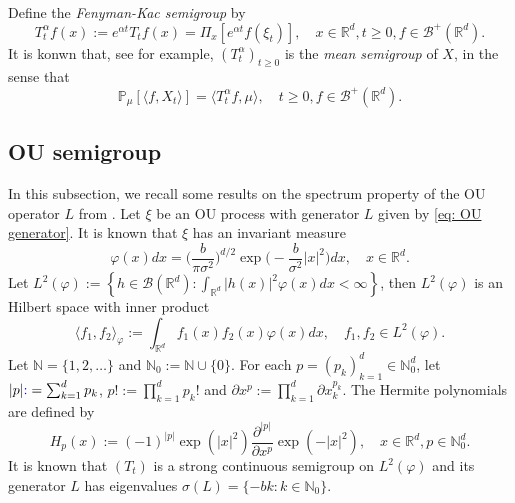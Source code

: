 \documentclass[12pt,oneside,english]{amsart}
\theoremstyle{plain}
\theoremstyle{definition}
\numberwithin{equation}{section}
\newcommand{\added}[1]{{\color{blue}#1}}\newcommand{\deleted}[1]{{\color{red}#1}}
\begin{document}
    Define the \emph{Fenyman-Kac semigroup} by
\begin{equation}\label{meansemigroup}
    T^{\alpha}_t f(x)
    :=
    e^{\alpha t} T_t f(x) =
    \Pi_x [e^{\alpha t}f(\xi_t)],
    \quad x\in \mathbb{R}^d,t\geq 0, f\in \mathscr B^+(\mathbb R^d).
\end{equation}
    It is konwn that, see \cite[Proposition 2.27]{Li2011Measure-valued} for example, $(T^\alpha_t)_{t\geq 0}$ is the \emph{mean semigroup} of $X$, in the sense that
\begin{equation}\label{eq:meanformula}
    \mathbb{P}_{\mu}[\langle f, X_t \rangle]
    = \langle T_t^\alpha f, \mu \rangle,
    \quad t\geq 0, f\in \mathscr B^+(\mathbb R^d).
\end{equation}

\subsection{OU semigroup}
    In this subsection, we recall some results on the spectrum property of the OU operator $L$ from \cite{GD}.
    Let $\xi$ be an OU process with generator $L$ given by \eqref{eq: OU generator}.
    It is known that $\xi$ has an invariant measure
\begin{equation}
\label{invariantdensity}
    \varphi(x)dx
    =\Big (\frac{b}{\pi \sigma^2}\Big )^{d/2}\exp \Big(-\frac{b}{\sigma^2}|x|^2 \Big)dx,
    \quad x\in \mathbb{R}^d.
\end{equation}
    Let $L^2(\varphi):= \left\{ h  \in \mathscr B(\mathbb R^d): \int_{\mathbb{R}^d} |h(x)|^2 \varphi(x) dx < \infty \right\}$, then $L^2(\varphi)$ is an Hilbert space with inner product
\begin{equation}
    \langle f_1, f_2 \rangle_{\varphi}
    := \int_{\mathbb{R}^d}f_1(x)f_2(x)\varphi(x) dx, \quad f_1,f_2 \in L^2(\varphi).
\end{equation}
     Let $\mathbb N = \{1,2,\dots\}$ and $\mathbb N_0 := \mathbb N\cup\{0\}$.
    For each $p = (p_k)_{k = 1}^d \in \mathbb{N}_0^{d}$, let $|p| \added{ :}=\sum_{k=1}^d p_k$, $p!:= \prod_{k= 1}^d p_k !$ and $\partial x^p:= \prod_{k = 1}^d\partial x_k^{p_k}$.
    The Hermite polynomials are defined by
\begin{equation}
    H_p(x)
    :=(-1)^{|p|}\exp(|x|^2) \frac{\partial ^{|p|}}{\partial x^p} \exp(-|x|^2) ,
    \quad x\in \mathbb R^d, p \in \mathbb{N}_0^{d}.
\end{equation}
    It is known that $(T_t)$ is a strong continuous semigroup on $L^2(\varphi)$ and its generator $L$ has eigenvalues $\sigma(L)= \{-bk: k \in \mathbb N_0\}$.
\end{document}
